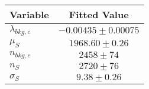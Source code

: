 \begin{tabular}[t]{lc}
\hline
Variable &Fitted Value\\
\hline\hline
$\lambda_{bkg,c}$&$-0.00435\pm0.00075$\\
\hline
$\mu_{S}$&$1968.60\pm0.26$\\
\hline
$n_{bkg,c}$&$2458\pm74$\\
\hline
$n_{S}$&$2720\pm76$\\
\hline
$\sigma_{S}$&$9.38\pm0.26$\\
\hline
\end{tabular}